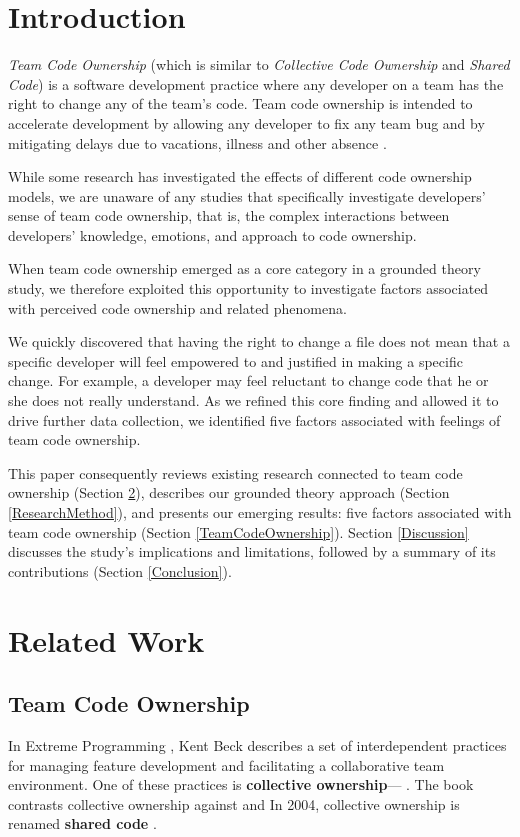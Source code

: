 
\section{Introduction}
\textit{Team Code Ownership} (which is similar to \textit{Collective Code Ownership} and \textit{Shared Code}) is a software development practice where any developer on a team has the right to change any of the team's code. Team code ownership is intended to accelerate development by allowing any developer to fix any team bug and by mitigating delays due to vacations, illness and other absence \cite{ExtremeProgramming2004}.
 
While some research has investigated the effects of different code ownership models, we are unaware of any studies that specifically investigate developers' sense of team code ownership, that is, the complex interactions between developers' knowledge, emotions, and approach to code ownership.  

When team code ownership emerged as a core category in a grounded theory study, we therefore exploited this opportunity to investigate factors associated with perceived code ownership and related phenomena. 

We quickly discovered that having the right to change a file does not mean that a specific developer will feel empowered to and justified in making a specific change. For example, a developer may feel reluctant to change code that he or she does not really understand. As we refined this core finding and allowed it to drive further data collection, we identified five factors associated with feelings of team code ownership. 

This paper consequently reviews existing research connected to team code ownership (Section \ref{RelatedWork}), describes our grounded theory approach (Section \ref{ResearchMethod}), and presents our emerging results: five factors associated with team code ownership (Section \ref{TeamCodeOwnership}). Section \ref{Discussion} discusses the study's implications and limitations, followed by a summary of its contributions (Section \ref{Conclusion}).
\section{Related Work}
\label{RelatedWork}

\subsection{Team Code Ownership}
In Extreme Programming \cite{ExtremeProgramming2004}, Kent Beck describes a set of interdependent practices for managing feature development and facilitating a collaborative team environment. One of these practices is \textbf{collective ownership}--- \cite{ExtremeProgramming2000}. The book contrasts collective ownership against  and  In 2004, collective ownership is renamed \textbf{shared code} \cite{ExtremeProgramming2004}.

